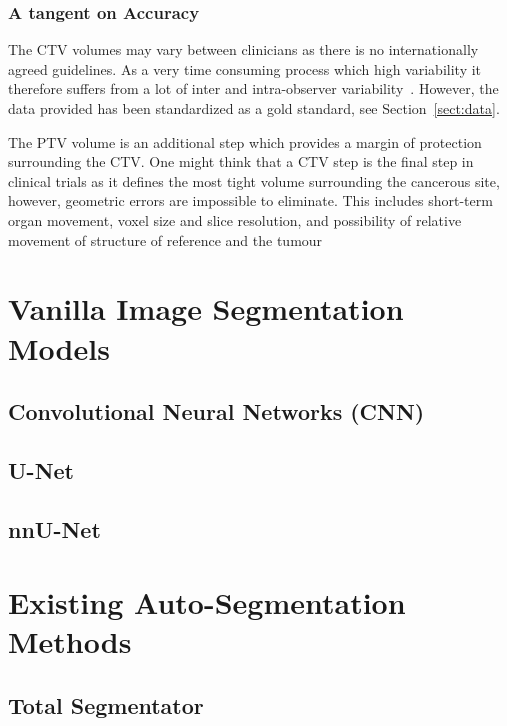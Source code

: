 \documentclass[11pt,twoside]{report}
\begin{document}
\subsubsection{A tangent on Accuracy}

The CTV volumes may vary between clinicians as there is no internationally agreed guidelines. As a very time consuming process which high variability it therefore suffers from a lot of inter and intra-observer variability~\cite{Lin2021-oz}. However, the data provided has been standardized as a gold standard, see Section~\ref{sect:data}.

The PTV volume is an additional step which provides a margin of protection surrounding the CTV. One might think that a CTV step is the final step in clinical trials as it defines the most tight volume surrounding the cancerous site, however, geometric errors are impossible to eliminate. This includes short-term organ movement, voxel size and slice resolution, and possibility of relative movement of structure of reference and the tumour~\cite{VANHERK200452}

\section{Vanilla Image Segmentation Models}\label{sect:vanilla-image-segmentation-models}

\subsection{Convolutional Neural Networks (CNN)}\label{sect:CNNs}

\subsection{U-Net}\label{sect:u-net}

\subsection{nnU-Net}\label{sect:nnu-net}

\section{Existing Auto-Segmentation Methods}\label{sect:existing-auto-segmentation-methods}

\subsection{Total Segmentator}\label{sect:totalseg}
\end{document}
